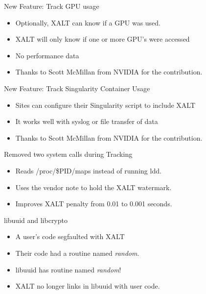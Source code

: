 \documentclass{beamer}
\begin{document}
\begin{frame}{New Feature: Track GPU usage}
  \begin{itemize}
    \item Optionally, XALT can know if a GPU was used.
    \item XALT will only know if one or more GPU's were accessed
    \item No performance data
    \item Thanks to Scott McMillan from NVIDIA for the contribution.
  \end{itemize}
\end{frame}

\begin{frame}{New Feature: Track Singularity Container Usage}
  \begin{itemize}
    \item Sites can configure their Singularity script to include XALT
    \item It works well with syslog or file transfer of data
    \item Thanks to Scott McMillan from NVIDIA for the contribution.
  \end{itemize}
\end{frame}

\begin{frame}{Removed two system calls during Tracking}
  \begin{itemize}
    \item Reads /proc/\$PID/maps instead of running ldd.
    \item Uses the vendor note to hold the XALT watermark.
    \item Improves XALT penalty from 0.01 to 0.001 seconds.
  \end{itemize}
\end{frame}

\begin{frame}{libuuid and libcrypto}
  \begin{itemize}
    \item A user's code segfaulted with XALT
    \item Their code had a routine named \emph{random}.
    \item libuuid has routine named \emph{random}!
    \item XALT no longer links in libuuid with user code.
  \end{itemize}
\end{frame}
\end{document}
